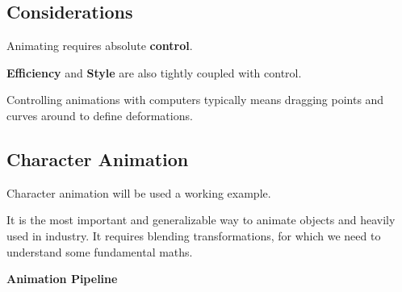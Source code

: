 \documentclass{article}
\begin{document}
\subsection{Considerations}

Animating requires absolute \textbf{control}.

\textbf{Efficiency} and \textbf{Style} are also tightly coupled with control.

Controlling animations with computers typically means dragging points and curves around to define deformations.


\subsection{Character Animation}

Character animation will be used a working example.

\vspace{5px}

It is the most important and generalizable way to animate objects and heavily used in industry.
It requires blending transformations, for which we need to understand some fundamental maths.

\vspace{10px}

\textbf{Animation Pipeline}

\vspace{-5px}
\end{document}
